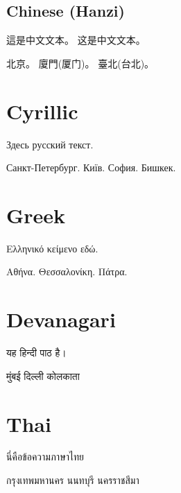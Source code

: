 \documentclass[a4paper]{article}
\begin{document}
\subsection{Chinese (Hanzi)}
\begin{chinese}
這是中文文本。
这是中文文本。

北京。
廈門(厦门)。
臺北(台北)。
\end{chinese}

\section{Cyrillic}
\begin{russian}
Здесь русский текст.

Санкт-Петербург.
Київ.
София.
Бишкек.
\end{russian}

\section{Greek}
\begin{greek}
Ελληνικό κείμενο εδώ.

Αθήνα.
Θεσσαλονίκη.
Πάτρα.
\end{greek}

\section{Devanagari}
\begin{hindi}
यह हिन्दी पाठ है।

मुंबई
दिल्ली
कोलकाता
\end{hindi}

\section{Thai}
\begin{thai}
นี่คือข้อความภาษาไทย

กรุงเทพมหานคร
นนทบุรี
นครราชสีมา
\end{thai}
\end{document}
